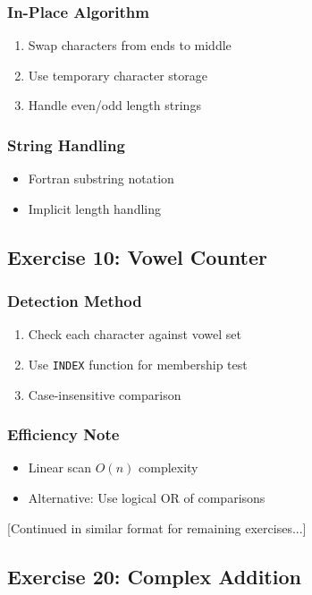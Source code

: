 \documentclass{book}
\begin{document}
\subsubsection*{In-Place Algorithm}
\begin{enumerate}
\item Swap characters from ends to middle
\item Use temporary character storage
\item Handle even/odd length strings
\end{enumerate}

\subsubsection*{String Handling}
\begin{itemize}
\item Fortran substring notation
\item Implicit length handling
\end{itemize}

\subsection*{Exercise 10: Vowel Counter}
\subsubsection*{Detection Method}
\begin{enumerate}
\item Check each character against vowel set
\item Use \texttt{INDEX} function for membership test
\item Case-insensitive comparison
\end{enumerate}

\subsubsection*{Efficiency Note}
\begin{itemize}
\item Linear scan \( O(n) \) complexity
\item Alternative: Use logical OR of comparisons
\end{itemize}

[Continued in similar format for remaining exercises...]

\subsection*{Exercise 20: Complex Addition}
\end{document}
